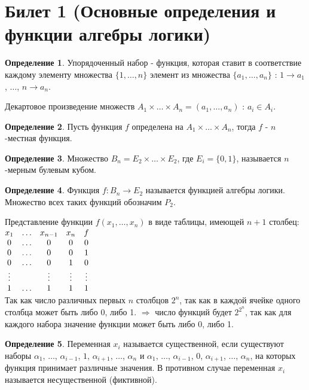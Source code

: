 \documentclass[a4paper, 12pt]{article}
\theoremstyle{definition}
\newtheorem*{definition}{Определение}
\theoremstyle{plain}
\theoremstyle{remark}
\begin{document}
  \tableofcontents
  \fontsize{14pt}{20pt}\selectfont
  \newpage
  \section{Билет 1 (Основные определения и функции алгебры логики)}
  \begin{definition}
    Упорядоченный набор - функция, которая ставит в соответствие каждому элементу множества $\{1, \ldots, n\}$ элемент из множества $\{a_1,\ldots,a_n\}$ : $1\rightarrow a_1$, $\ldots$, $n\rightarrow a_n$.
  \end{definition}
  Декартовое произведение множеств $A_1\times\ldots\times A_n=(a_1, \ldots, a_n)$ : $a_i\in A_i$.
  \begin{definition}
    Пусть функция $f$ определена на $A_1\times\ldots\times A_n$, тогда $f$ - $n$-местная функция.
  \end{definition}
  \begin{definition}
    Множество $B_n=E_2\times\ldots\times E_2$, где $E_i=\{0,1\}$, называется $n$-мерным булевым кубом.
  \end{definition}
  \begin{definition}
    Функция $f:B_n \to E_2$ называется функцией алгебры логики. Множество всех таких функций обозначим $P_2$.
  \end{definition}
  Представление функции $f(x_1, \ldots, x_n)$ в виде таблицы, имеющей $n+1$ столбец:\\
  $\begin{matrix}
    x_1 & \ldots & x_{n-1} & x_n & f\\
    0 & \ldots & 0 & 0 & 0\\
    0 & \ldots & 0 & 0 & 1\\
    0 & \ldots & 0 & 1 & 0\\
    \vdots & \null & \vdots & \vdots & \vdots\\
    1 & \ldots & 1 & 1 & 1 
  \end{matrix}$\\
  Так как число различных первых $n$ столбцов $2^n$, так как в каждой ячейке одного столбца может быть либо 0, либо 1. $\Longrightarrow$ число функций будет $2^{2^n}$, так как для каждого набора значение функции может быть либо 0, либо 1.
  \begin{definition}
    Переменная $x_i$ называется существенной, если существуют наборы $\alpha_1$, $\ldots$, $\alpha_{i-1}$, $1$, $\alpha_{i+1}$, $\ldots$, $\alpha_n$ и $\alpha_1$, $\ldots$, $\alpha_{i-1}$, $0$, $\alpha_{i+1}$, $\ldots$, $\alpha_n$, на которых функция принимает различные значения. В противном случае переменная $x_i$ называется несущественной (фиктивной).
  \end{definition}
\end{document}
